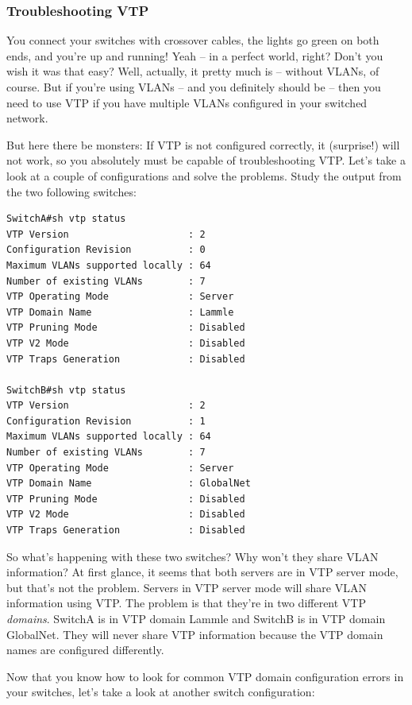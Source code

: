 \subsubsection[Troubleshooting
VTP]{\texorpdfstring{\protect\hypertarget{c15.xhtmlux5cux23c15-sec-8}{}{}Troubleshooting
VTP}{Troubleshooting VTP}}

You connect your switches with crossover cables, the lights go green on
both ends, and you're up and running! Yeah -- in a perfect world, right?
Don't you wish it was that easy? Well, actually, it pretty much
is -- without VLANs, of course. But if you're using VLANs -- and you
definitely should be -- then you need to use VTP if you have multiple
VLANs configured in your switched network.

But here there be monsters: If VTP is not configured correctly, it
(surprise!) will not work, so you absolutely must be capable of
troubleshooting VTP. Let's take a look at a couple of configurations and
solve the problems. Study the output from the two following switches:

\begin{verbatim}
SwitchA#sh vtp status
VTP Version                     : 2
Configuration Revision          : 0
Maximum VLANs supported locally : 64
Number of existing VLANs        : 7
VTP Operating Mode              : Server
VTP Domain Name                 : Lammle
VTP Pruning Mode                : Disabled
VTP V2 Mode                     : Disabled
VTP Traps Generation            : Disabled
 
SwitchB#sh vtp status
VTP Version                     : 2
Configuration Revision          : 1
Maximum VLANs supported locally : 64
Number of existing VLANs        : 7
VTP Operating Mode              : Server
VTP Domain Name                 : GlobalNet
VTP Pruning Mode                : Disabled
VTP V2 Mode                     : Disabled
VTP Traps Generation            : Disabled
\end{verbatim}

So what's happening with these two switches? Why won't they share VLAN
information? At first glance, it seems that both servers are in VTP
server mode, but that's not the problem. Servers in VTP server mode will
share VLAN information using VTP. The problem is that they're in two
different VTP \emph{domains}. SwitchA is in VTP domain Lammle and SwitchB
is in VTP domain GlobalNet. They will never share VTP information
because the VTP domain names are configured differently.

Now that you know how to look for common VTP domain configuration errors
in your switches, let's take a look at another switch configuration:

